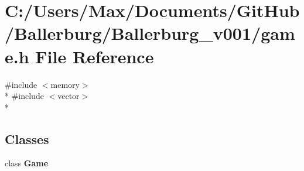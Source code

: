 \section{C\+:/\+Users/\+Max/\+Documents/\+Git\+Hub/\+Ballerburg/\+Ballerburg\+\_\+v001/game.h File Reference}
\label{game_8h}
{\ttfamily \#include $<$memory$>$}\\*
{\ttfamily \#include $<$vector$>$}\\*
\subsection*{Classes}
\begin{DoxyCompactItemize}
\item 
class {\bf Game}
\end{DoxyCompactItemize}
